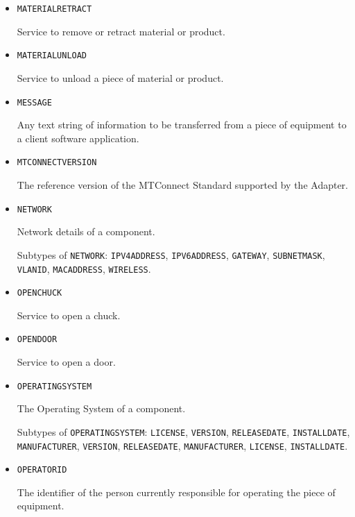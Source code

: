 \begin{itemize}
\item \texttt{MATERIAL\textunderscore RETRACT}  

Service to remove or retract material or product.


\item \texttt{MATERIAL\textunderscore UNLOAD}  

Service to unload a piece of material or product.


\item \texttt{MESSAGE}  

Any text string of information to be transferred from a piece of equipment to a client software application.


\item \texttt{MTCONNECT\textunderscore VERSION}  

The reference version of the MTConnect Standard supported by the \gls{Adapter}.


\item \texttt{NETWORK}  

Network details of a component.

Subtypes of \texttt{NETWORK}: \texttt{IPV4\textunderscore ADDRESS}, \texttt{IPV6\textunderscore ADDRESS}, \texttt{GATEWAY}, \texttt{SUBNET\textunderscore MASK}, \texttt{VLAN\textunderscore ID}, \texttt{MAC\textunderscore ADDRESS}, \texttt{WIRELESS}.

\item \texttt{OPEN\textunderscore CHUCK}  

Service to open a chuck.


\item \texttt{OPEN\textunderscore DOOR}  

Service to open a door.


\item \texttt{OPERATING\textunderscore SYSTEM}  

The Operating System of a component.

Subtypes of \texttt{OPERATING\textunderscore SYSTEM}: \texttt{LICENSE}, \texttt{VERSION}, \texttt{RELEASE\textunderscore DATE}, \texttt{INSTALL\textunderscore DATE}, \texttt{MANUFACTURER}, \texttt{VERSION}, \texttt{RELEASE\textunderscore DATE}, \texttt{MANUFACTURER}, \texttt{LICENSE}, \texttt{INSTALL\textunderscore DATE}.

\item \texttt{OPERATOR\textunderscore ID}  

The identifier of the person currently responsible for operating the piece of equipment.



\end{itemize}
